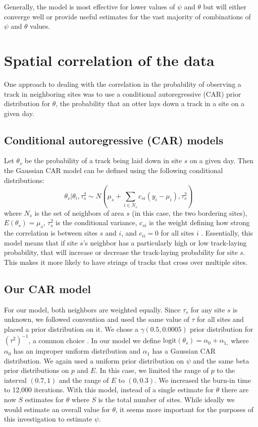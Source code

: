 \documentclass[12pt]{article}
\begin{document}
    Generally, the model is most effective for lower values of \(\psi\) and
    \(\theta\) but will either converge well or provide useful estimates for the
    vast majority of combinations of \(\psi\) and \(\theta\) values.

\section{Spatial correlation of the data}
One approach to dealing with the correlation in the probability of
observing a track in neighboring sites was to use a conditional autoregressive
(CAR) prior distribution for $\theta$, the probability that an otter lays down a
track in a site on a given day.

    \subsection{Conditional autoregressive (CAR) models}
    Let $\theta_s$ be the probability of a track being laid down in site $s$ on
    a given day. Then the Gaussian CAR model can be defined using the following
    conditional distributions:
    \begin{equation}
        \theta_s|\theta_i,\tau_s^2 \sim N(\mu_s+\sum_{i\in N_s}
        c_{si}(y_i-\mu_i),\tau_s^2)
    \end{equation}
    where $N_s$ is the set of neighbors of area $s$ (in this case, the two
    bordering sites), $E(\theta_s)=\mu_s$, $\tau_s^2$ is the conditional
    variance, $c_{si}$ is the weight defining how strong the correlation is
    between sites $s$ and $i$, and $c_{ii}=0$ for all sites $i$ \cite{Arab2008}.
    Essentially, this model means that if site $s$'s neighbor has a
    particularly high or low track-laying probability, that will increase or
    decrease the track-laying probability for site $s$. This makes it more
    likely to have strings of tracks that cross over multiple sites.

    \subsection{Our CAR model}
    \label{car model}
    For our model, both neighbors are weighted equally. Since $\tau_s$ for any
    site $s$ is unknown, we followed convention and used the same value of
    $\tau$ for all sites and placed a prior distribution on it. We chose a
    $\gamma(0.5,0.0005)$ prior distribution for $(\tau^2)^{-1}$, a common choice
    \cite{Thomas2004}. In our model we define $\text{logit}(\theta_s)=\alpha_0+
    \alpha_{1_s}$ where $\alpha_0$ has an improper uniform distribution and
    $\alpha_1$ has a Gaussian CAR distribution. We again used a uniform prior
    distribution on $\psi$ and the same beta prior distributions on $p$ and $E$.
    In this case, we limited the range of $p$ to the interval $(0.7,1)$ and the
    range of $E$ to $(0,0.3)$. We increased the burn-in time to 12,000
    iterations. With this model, instead of a single estimate for $\theta$ there
    are now $S$ estimates for $\theta$ where $S$ is the total number of sites.
    While ideally we would estimate an overall value for $\theta$, it seems more
    important for the purposes of this investigation to estimate $\psi$.
\end{document}
